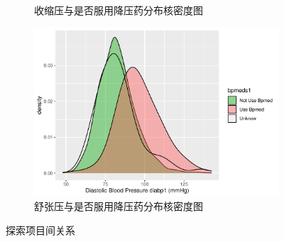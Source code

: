 \documentclass[lang=cn,11pt,a4paper,cite=super,AutoFakeBold]{elegantpaper}
\begin{document}
\begin{figure}[!hbt]
\begin{subfigure}[b]{0.49\textwidth}
       \caption{收缩压与是否服用降压药分布核密度图}
       \label{fig:ssyjyy}
       \end{subfigure}
       \begin{subfigure}[b]{0.49\textwidth}
         \centering
         \includegraphics[width=\linewidth]{img/dia4-1.pdf}  
         \caption{舒张压与是否服用降压药分布核密度图}
         \label{fig:szyjyy}
       \end{subfigure}
      \caption{探索项目间关系}
   \end{figure}
\end{document}
